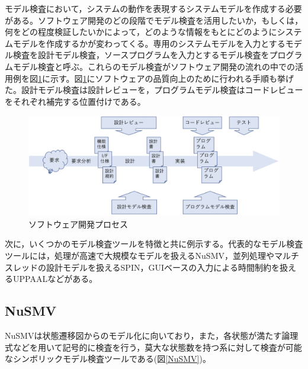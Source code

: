 \documentclass{tpu-sotu}
\begin{document}
	モデル検査において，システムの動作を表現するシステムモデルを作成する必要がある。ソフトウェア開発のどの段階でモデル検査を活用したいか，もしくは，何をどの程度検証したいかによって，どのような情報をもとにどのようにシステムモデルを作成するかが変わってくる。専用のシステムモデルを入力とするモデル検査を設計モデル検査，ソースプログラムを入力とするモデル検査をプログラムモデル検査と呼ぶ。これらのモデル検査がソフトウェア開発の流れの中での活用例を図\ref{develP}に示す。図\ref{develP}にソフトウェアの品質向上のために行われる手順も挙げた。設計モデル検査は設計レビューを，プログラムモデル検査はコードレビューをそれぞれ補完する位置付けである。
	\begin{figure}[htbp]
	\centering
	\includegraphics[width=150mm]{developmentProcess.png}
	\caption{ソフトウェア開発プロセス}
	\label{develP}
	\end{figure}
	
	次に，いくつかのモデル検査ツールを特徴と共に例示する。代表的なモデル検査ツールには，処理が高速で大規模なモデルを扱えるNuSMV\cite{Nu}，並列処理やマルチスレッドの設計モデルを扱えるSPIN\cite{s1}，GUIベースの入力による時間制約を扱えるUPPAALなどがある。
	\subsection{NuSMV}
	
	NuSMVは状態遷移図からのモデル化に向いており，また，各状態が満たす論理式などを用いて記号的に検査を行う，莫大な状態数を持つ系に対して検査が可能なシンボリックモデル検査ツールである(図\ref{NuSMV})。
		
\end{document}
